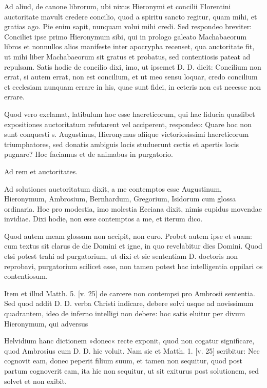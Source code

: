 Ad aliud, de canone librorum, ubi nixus Hieronymi et concilii Florentini auctoritate mavult credere concilio, quod a spiritu sancto regitur, quam mihi, et gratias ago. Pie enim sapit, nunquam volui mihi credi. Sed respondeo breviter: Conciliet ipse primo Hieronymum sibi, qui in prologo galeato Machabaeorum libros et nonnullos alios manifeste inter apocrypha recenset, qua auctoritate fit, ut mihi liber Machabaeorum sit gratus et probatus, sed contentiosis pateat ad repulsam. Satis hodie de concilio dixi, imo, ut ipsemet D. D. dicit: Concilium non errat, si autem errat, non est concilium, et ut meo sensu loquar, credo concilium et ecclesiam nunquam errare in his, quae sunt fidei, in ceteris non est necesse non errare.

Quod vero exclamat, latibulum hoc esse haereticorum, qui hac fiducia quaslibet expositiones auctoritatum refutarent vel acciperent, respondeo: Quare hoc non sunt conquesti s. Augustinus, Hieronymus aliique victoriosissimi haereticorum triumphatores, sed donatis ambiguis locis studuerunt certis et apertis locis pugnare? Hoc faciamus et de animabus in purgatorio.

Ad rem et auctoritates.

Ad solutiones auctoritatum dixit, a me contemptos esse Augustinum, Hieronymum, Ambrosium, Bernhardum, Gregorium, Isidorum cum glossa ordinaria. Hoc pro modestia, imo molestia Ecciana dixit, nimis cupidus movendae invidiae. Dixi hodie, non esse contemptos a me, et iterum dico.

Quod autem meam glossam non accipit, non curo. Probet autem ipse et suam: cum textus sit clarus de die Domini et igne, in quo revelabitur dies Domini. Quod etsi potest trahi ad purgatorium, ut dixi et sic sententiam D. doctoris \marginpar{\small[340]} non reprobavi, purgatorium scilicet esse, non tamen potest hac intelligentia oppilari os contentiosum.

Item et illud Matth. 5. [v. 25] de carcere non contempsi pro Ambrosii sententia. Sed quod addit D. D. verba Christi indicare, debere solvi usque ad novissimum quadrantem, ideo de inferno intelligi non debere: hoc satis eluitur per divum Hieronymum, qui adversus

Helvidium hanc dictionem »donec« recte exponit, quod non cogatur significare, quod Ambrosius cum D. D. hic voluit. Nam sic et Matth. 1. [v. 25] scribitur: Nec cognovit eam, donec peperit filium suum, et tamen non sequitur, quod post partum cognoverit eam, ita hic non sequitur, ut sit exiturus post solutionem, sed solvet et non exibit.

